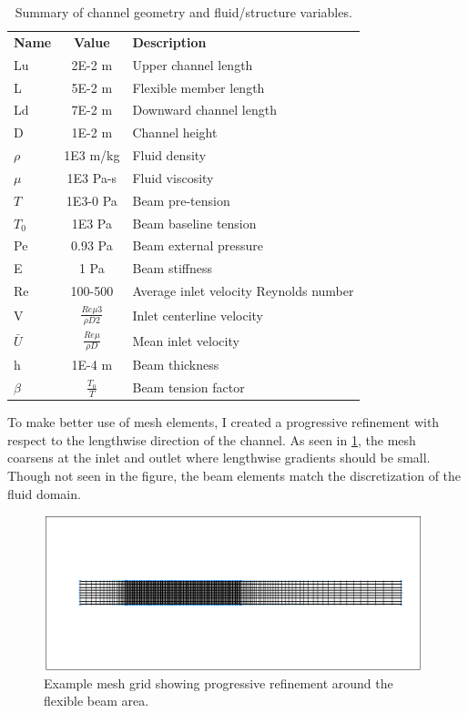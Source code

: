 \documentclass[10pt,english]{article}
\begin{document}
\begin{table}[h]
\vspace{20pt}
\centering
  \begin{tabular}{lcl}
    \textbf{Name} & \textbf{Value} & \textbf{Description}  \\
    Lu & 2E-2 m & Upper channel length  \\
    L & 5E-2 m & Flexible member length\\
    Ld & 7E-2 m & Downward channel length\\
    D & 1E-2 m & Channel height\\
    $\rho$  & 1E3 m/kg & Fluid density\\
    $\mu$  & 1E3 Pa-s & Fluid viscosity\\ 
   $T$  & 1E3-0 Pa & Beam pre-tension \\
    $T_0$  & 1E3 Pa & Beam baseline tension \\ 
   Pe  & 0.93 Pa & Beam external pressure \\ 
  E  & 1 Pa & Beam stiffness \\ 
   Re  & 100-500 & Average inlet velocity Reynolds number\\ 
  V  & $\frac{Re \mu 3}{\rho D 2}$ & Inlet centerline velocity \\ 
  $\bar{U}$  & $\frac{Re \mu}{\rho D}$ & Mean inlet velocity \\ 
    h  & 1E-4 m & Beam thickness \\ 
    $\beta$  & $\frac{T_0}{T}$ & Beam tension factor \\ 
  \end{tabular}
  \caption{Summary of channel geometry and fluid/structure variables.}
  \label{tab:params}
\end{table}

\newpage

To make better use of mesh elements, I created a progressive refinement with respect to the lengthwise direction of the channel.  As seen in \cref{f:grid_1_5}, the mesh coarsens at the inlet and outlet where lengthwise gradients should be small.  Though not seen in the figure, the beam elements match the discretization of the fluid domain.

\begin{figure}[htbp]
\centering
\includegraphics[trim={2.85cm 5cm 1.6cm 4cm},clip,width=0.98\textwidth]{Mesh1_5.png}
\caption{Example mesh grid showing progressive refinement around the flexible beam area.}
\label{f:grid_1_5}
\end{figure}
\end{document}

